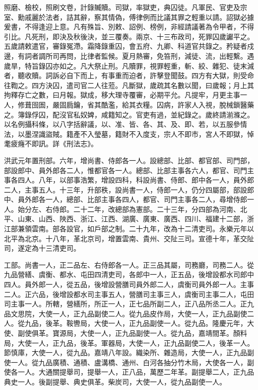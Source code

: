 照磨、檢校，照刷文卷，計錄贓贖。司獄，率獄吏，典囚徒。凡軍民、官吏及宗室、勳戚麗於法者，詰其辭，察其情偽，傅律例而比議其罪之輕重以請。詔獄必據爰書，不得逢迎上意。凡有殊旨、別敕、詔例、榜例，非經請議著為令甲者，不得引比。凡死刑，即決及秋後決，並三覆奏。兩京、十三布政司，死罪囚歲讞平之。五歲請敕遣官，審錄冤滯。霜降錄重囚，會五府、九卿、科道官共錄之。矜疑者戍邊，有詞者調所司再問，比律者監候。夏月熱審，免笞刑，減徒、流，出輕繫。遇歲旱，特旨錄囚亦如之。凡大祭止刑。凡贖罪，視罪輕重，斬、絞、雜犯、徒末減者，聽收贖。詞訴必自下而上，有事重而迫者，許擊登聞鼓。四方有大獄，則受命往鞫之。四方決囚，遣司官二人往蒞。凡斷獄，歲疏其名數以聞，曰歲報；月上其拘釋存亡之數，曰月報。獄成，移大理寺覆審，必期平允。凡提牢，月更主事一人，修葺囹圄，嚴固扃鑰，省其酷濫，給其衣糧。囚病，許家人入視，脫械鎖醫藥之。簿錄俘囚，配沒官私奴婢，咸籍知之。官吏有過，並紀錄之。歲終請湔滌之。以名例攝科條，以八字括辭議，以、准、皆、各、其、及、即、若，以五服參情法，以墨涅識盜賊。籍產不入瑩墓，籍財不入度支，宗人不即市，宮人不即獄，悼耄疲癃不即訊。詳《刑法志》。

洪武元年置刑部。六年，增尚書、侍郎各一人。設總部、比部、都官部、司門部，部設郎中、員外郎各二人，惟都官各一人。總部、比部主事各六人，都官、司門主事各四人。八年，以部事浩繁，增設四科，科設尚書、侍郎、郎中各一人，員外郎二人，主事五人。十三年，升部秩，設尚書一人，侍郎一人，仍分四屬部，部設郎中、員外郎各一人，總部、比部主事各四人，都官、司門主事各二人，尋增侍郎一人。始分左、右侍郎。二十二年，改總部為憲部。二十三年，分四部為河南、北平、山東、山西、陜西、浙江、江西、湖廣、廣東、廣西、四川、福建十二部，浙江部兼領雲南。部各設官，如戶部之制。二十九年，改為十二清吏司。永樂元年以北平為北京。十八年，革北京司，增置雲南、貴州、交阯三司。宣德十年，革交阯司，遂定為十三清吏司。

工部。尚書一人，正二品左、右侍郎各一人。正三品其屬，司務廳，司務二人。從九品營繕、虞衡、都水、屯田四清吏司，各郎中一人，正五品，後增設都水司郎中四人。員外郎一人，從五品，後增設營膳司員外郎二人，虞衡司員外郎一人。主事二人。正六品，後增設都水司主事五人，營膳司主事三人，虞衡司主事二人，屯田司主事一人。所轄，營繕所，所正一人，正七品所副二人，正八品所丞二人。正九品文思院，大使一人，正九品副使二人。從九品皮作局，大使一人，正九品副使二人。從九品，後革。鞍轡局，大使一人，正九品副使一人。從九品。隆慶元年，大使、副使俱革。寶源局，大使一人，正九品副使一人。從九品，嘉靖間革。顏料局，大使一人，正九品，後革。軍器局，大使一人，正九品副使二人，後革一人。節慎庫，大使一人，從九品。嘉靖八年設。織染所、雜造局，大使一人，正九品副使一人。從九品廣積、通積、盧溝橋、通州、白河各抽分竹木局，大使各一人，副使各一人。大通關提舉司，提舉一人，正八品，萬歷二年革。副提舉二人，正九品典史一人。後副提舉、典史俱革。柴炭司，大使一人，從九品副使一人。

